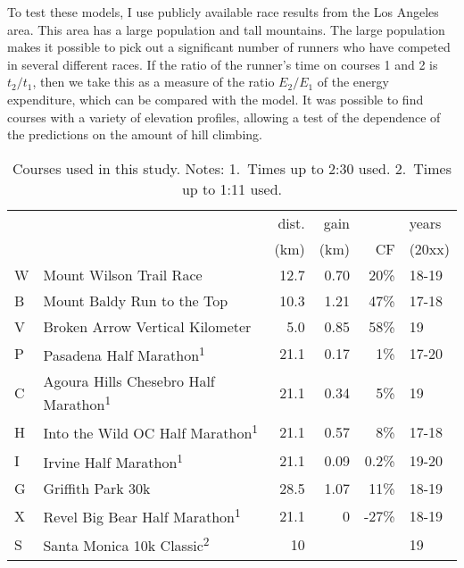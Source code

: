 \documentclass[10pt,letterpaper]{article}
\begin{document}
To test these models, I use publicly available race results from the Los Angeles area.
This area has a large population and tall mountains. The large population makes it possible
to pick out a significant number of runners who have competed in several different races.
If the ratio of the runner's time on courses 1 and 2 is $t_2/t_1$, then we take this
as a measure of the ratio $E_2/E_1$ of the energy expenditure, which can be compared with
the model. It was possible to find courses with a variety of elevation profiles, allowing
a test of the dependence of the predictions on the amount of hill climbing.

\begin{table}[h]\label{table:courses}
\caption{Courses used in this study. Notes: 1.~Times up to 2:30 used. 
2.~Times up to 1:11 used.
}
\begin{tabular}{lp{60mm}rrrl}
                 &       & dist.  & gain &  &  years \\
                 &       & (km)      &  (km) & CF & (20xx) \\
W & Mount Wilson Trail Race         & 12.7 & 0.70 & 20\%        & 18-19\\
B & Mount Baldy Run to the Top      & 10.3 & 1.21 & 47\%        & 17-18\\
V & Broken Arrow Vertical Kilometer & 5.0  & 0.85 & 58\%        & 19 \\
P & Pasadena Half Marathon\textsuperscript{1}
                                    & 21.1 & 0.17 & 1\%         & 17-20 \\
C & Agoura Hills Chesebro Half Marathon\textsuperscript{1}
                                    & 21.1 & 0.34 & 5\%     & 19 \\
H & Into the Wild OC Half Marathon\textsuperscript{1}
                                    & 21.1 & 0.57 & 8\% & 17-18\\
I & Irvine Half Marathon\textsuperscript{1}
                                    & 21.1 & 0.09 & 0.2\% & 19-20\\
G & Griffith Park 30k
                                    & 28.5 & 1.07 & 11\%        & 18-19 \\
X & Revel Big Bear Half Marathon\textsuperscript{1}
                                    & 21.1 & 0    & -27\% & 18-19 \\
S & Santa Monica 10k Classic\textsuperscript{2}        & 10 & & & 19\\
\end{tabular}
\label{table:courses}
\end{table}
\end{document}
